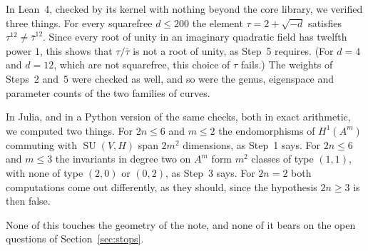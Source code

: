\documentclass[11pt]{amsart}
\theoremstyle{definition}
\theoremstyle{remark}
\newcommand{\SU}{\operatorname{SU}}
\begin{document}
In Lean~4, checked by its kernel with nothing beyond the core library, we
verified three things. For every squarefree $d\le200$ the element
$\tau=2+\sqrt{-d}$ satisfies $\tau^{12}\ne\bar\tau^{12}$. Since every root of
unity in an imaginary quadratic field has twelfth power $1$, this shows that
$\tau/\bar\tau$ is not a root of unity, as Step~5 requires. (For $d=4$ and
$d=12$, which are not squarefree, this choice of $\tau$ fails.) The weights
of Steps~2 and~5 were checked as well, and so were the genus, eigenspace and
parameter counts of the two families of curves.

In Julia, and in a Python version of the same checks, both in exact
arithmetic, we computed two things. For $2n\le6$ and $m\le2$ the
endomorphisms of $H^{1}(A^{m})$ commuting with $\SU(V,H)$ span $2m^{2}$
dimensions, as Step~1 says. For $2n\le6$ and $m\le3$ the invariants in
degree two on $A^{m}$ form $m^{2}$ classes of type $(1,1)$, with none of type
$(2,0)$ or $(0,2)$, as Step~3 says. For $2n=2$ both computations come out
differently, as they should, since the hypothesis $2n\ge3$ is then false.

None of this touches the geometry of the note, and none of it bears on the
open questions of Section~\ref{sec:stops}.
\end{document}
